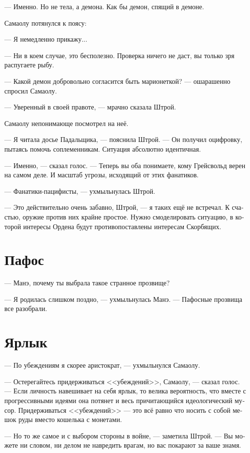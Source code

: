 \documentclass[a4paper,12pt,fleqn]{book}\usepackage{polyglossia}\setdefaultlanguage[babelshorthands=true]{russian}\setotherlanguage{english}\defaultfontfeatures{Ligatures=TeX,Mapping=tex-text}\usepackage{xcolor}\newcommand{\ml}[3]{#2}
\begin{document}
{--- Именно.
Но не тела, а демона.
Как бы демон, спящий в демоне.

Самаолу потянулся к поясу:

--- Я немедленно прикажу...

--- Ни в коем случае, это бесполезно.
Проверка ничего не даст, вы только зря распугаете рыбу.

--- Какой демон добровольно согласится быть марионеткой? --- ошарашенно спросил Самаолу.

--- Уверенный в своей правоте, --- мрачно сказала Штрой.

Самаолу непонимающе посмотрел на неё.

--- Я читала досье Падальщика, --- пояснила Штрой.
--- Он получил оцифровку, пытаясь помочь соплеменникам.
Ситуация абсолютно идентичная.

--- Именно, --- сказал голос.
--- Теперь вы оба понимаете, кому Грейсвольд верен на самом деле.
И масштаб угрозы, исходящий от этих фанатиков.

--- Фанатики-пацифисты, --- ухмыльнулась Штрой.

--- Это действительно очень забавно, Штрой, --- я таких ещё не встречал.
К счастью, оружие против них крайне простое.
Нужно смоделировать ситуацию, в которой интересы Ордена будут противопоставлены интересам Скорбящих.

\section{Пафос}

--- Манэ, почему ты выбрала такое странное прозвище?

--- Я родилась слишком поздно, --- ухмыльнулась Манэ.
--- Пафосные прозвища все разобрали.

\section{Ярлык}

--- По убеждениям я скорее аристократ, --- ухмыльнулся Самаолу.

--- Остерегайтесь придерживаться <<убеждений>>, Самаолу, --- сказал голос.
--- Если личность навешивает на себя ярлык, то велика вероятность, что вместе с прогрессивными идеями она потянет и весь причитающийся идеологический мусор.
Придерживаться <<убеждений>> --- это всё равно что носить с собой мешок руды вместо кошелька с монетами.

--- Но то же самое и с выбором стороны в войне, --- заметила Штрой.
--- Вы можете ни словом, ни делом не навредить врагам, но вас покарают за ваше знамя.

}
\end{document}
